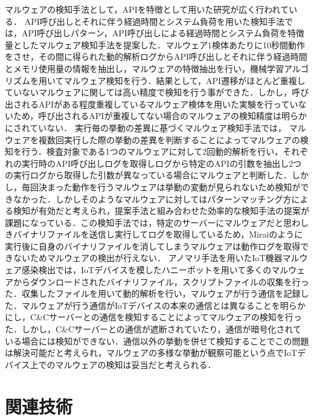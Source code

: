 マルウェアの検知手法として，APIを特徴として用いた研究が広く行われている．
API呼び出しとそれに伴う経過時間とシステム負荷を用いた検知手法\cite{パターン}では，API呼び出しパターン，API呼び出しによる経過時間とシステム負荷を特徴量としたマルウェア検知手法を提案した．マルウェア1検体あたりに10秒間動作をさせ，その間に得られた動的解析ログからAPI呼び出しとそれに伴う経過時間とメモリ使用量の情報を抽出し，マルウェアの特徴抽出を行い，機械学習アルゴリズムを用いてマルウェア検知を行う．結果として，API遷移がほとんど重複していないマルウェアに関しては高い精度で検知を行う事ができた．しかし，呼び出されるAPIがある程度重複しているマルウェア検体を用いた実験を行っていないため，呼び出されるAPIが重複してない場合のマルウェアの検知精度は明らかにされていない．
実行毎の挙動の差異に基づくマルウェア検知手法\cite{挙動の差異}では，
マルウェアを複数回実行した際の挙動の差異を判断することによってマルウェアの検知を行う．検査対象である1つのマルウェアに対して2回動的解析を行い，それぞれの実行時のAPI呼び出しログを取得しログから特定のAPIの引数を抽出し2つの実行ログから取得した引数が異なっている場合にマルウェアと判断した．しかし，毎回決まった動作を行うマルウェアは挙動の変動が見られないため検知ができなかった．しかしそのようなマルウェアに対してはパターンマッチング方による検知が有効だと考えられ，提案手法と組み合わせた効率的な検知手法の提案が課題になっている．この検知手法では，特定のサーバーにマルウェアだと思わしきバイナリファイルを送信し実行してログを取得しているため，Miraiのように実行後に自身のバイナリファイルを消してしまうマルウェアは動作ログを取得できないためマルウェアの検出が行えない．
アノマリ手法を用いたIoT機器マルウェア感染検出\cite{アノマリ}では，IoTデバイスを模したハニーポットを用いて多くのマルウェアからダウンロードされたバイナリファイル，スクリプトファイルの収集を行った．収集したファイルを用いて動的解析を行い，マルウェアが行う通信を記録した．マルウェアが行う通信がIoTデバイスの本来の通信とは異なることを明らかにし，C\&Cサーバーとの通信を検知することによってマルウェアの検知を行った．しかし，C\&Cサーバーとの通信が遮断されていたり，通信が暗号化されている場合には検知ができない．通信以外の挙動を併せて検知することでこの問題は解決可能だと考えられ，マルウェアの多様な挙動が観察可能という点でIoTデバイス上でのマルウェアの検知は妥当だと考えられる．

\section{関連技術}

